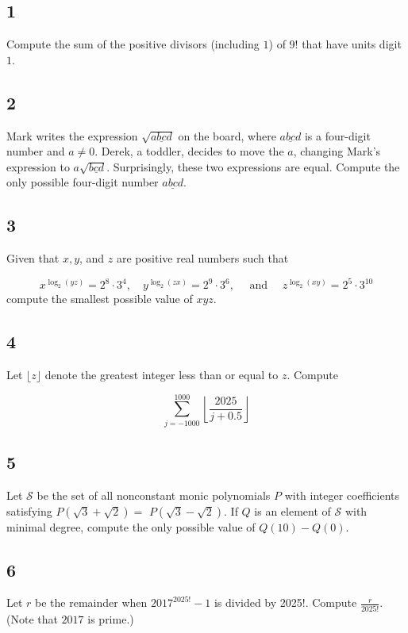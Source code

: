 \subsection{1}
Compute the sum of the positive divisors (including $1$) of $9!$ that have units digit $1$.

\subsection{2}
Mark writes the expression $\sqrt{\underline{a b c d}}$ on the board, where $\underline{a b c d}$ is a four-digit number and $a \neq 0$. Derek, a toddler, decides to move the $a$, changing Mark's expression to $a \sqrt{\underline{b c d}}$. Surprisingly, these two expressions are equal. Compute the only possible four-digit number $\underline{a b c d}$.

\subsection{3}
Given that $x, y$, and $z$ are positive real numbers such that

$$
x^{\log _{2}(y z)}=2^{8} \cdot 3^{4}, \quad y^{\log _{2}(z x)}=2^{9} \cdot 3^{6}, \quad \text { and } \quad z^{\log _{2}(x y)}=2^{5} \cdot 3^{10}
$$
compute the smallest possible value of $x y z$.

\subsection{4}
Let $\lfloor z\rfloor$ denote the greatest integer less than or equal to $z$. Compute

$$
\sum_{j=-1000}^{1000}\left\lfloor\frac{2025}{j+0.5}\right\rfloor
$$

\subsection{5}
Let $\mathcal{S}$ be the set of all nonconstant monic polynomials $P$ with integer coefficients satisfying $P(\sqrt{3}+\sqrt{2})=$ $P(\sqrt{3}-\sqrt{2})$. If $Q$ is an element of $\mathcal{S}$ with minimal degree, compute the only possible value of $Q(10)-Q(0)$.

\subsection{6}
Let $r$ be the remainder when $2017^{2025!}-1$ is divided by 2025!. Compute $\frac{r}{2025!}$. (Note that $2017$ is prime.)

